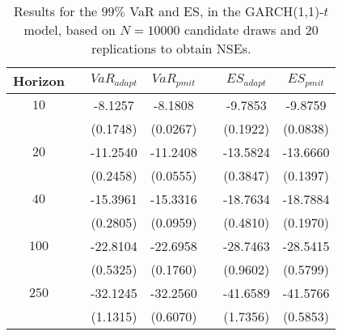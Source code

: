 \begin{table}[h] 
\centering 
\caption{Results for the $99\%$ VaR and ES, in the GARCH(1,1)-$t$ model, based on $N=10000$ candidate draws and $20$ replications to obtain NSEs.} 
\label{tab:res_pmit_t_garch2_noS} 
\begin{tabular}{ccccccc}  
 Horizon & & $VaR_{adapt}$ & $VaR_{pmit}$ & & $ES_{adapt}$ & $ES_{pmit}$ \\ \hline 
$10$ & & -8.1257 & -8.1808 & & -9.7853 & -9.8759  \\ 
 & & (0.1748) & (0.0267) & & (0.1922) & (0.0838)   \\ [1ex] 
$20$ & & -11.2540 & -11.2408 & & -13.5824 & -13.6660  \\ 
 & & (0.2458) & (0.0555) & & (0.3847) & (0.1397)   \\ [1ex] 
$40$ & & -15.3961 & -15.3316 & & -18.7634 & -18.7884  \\ 
 & & (0.2805) & (0.0959) & & (0.4810) & (0.1970)   \\ [1ex] 
$100$ & & -22.8104 & -22.6958 & & -28.7463 & -28.5415  \\ 
 & & (0.5325) & (0.1760) & & (0.9602) & (0.5799)   \\ [1ex] 
$250$ & & -32.1245 & -32.2560 & & -41.6589 & -41.5766  \\ 
 & & (1.1315) & (0.6070) & & (1.7356) & (0.5853)   \\ [1ex] 
\hline 
\end{tabular} 
\end{table} 

